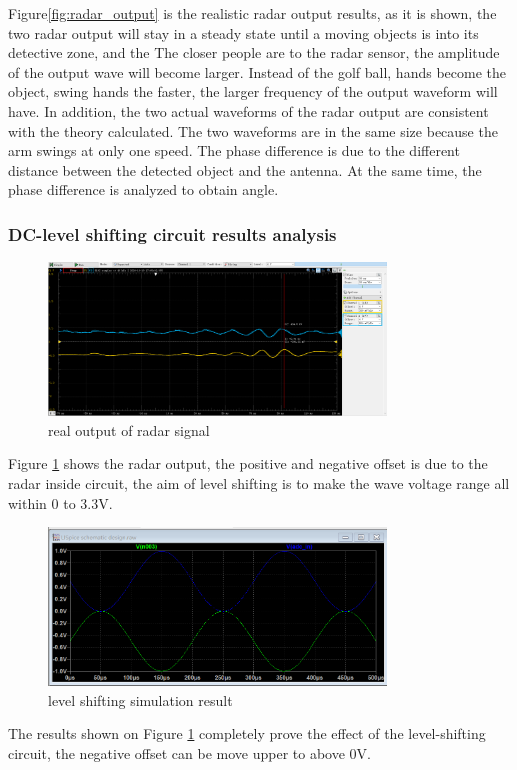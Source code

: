 Figure\ref{fig:radar_output} is the realistic radar output results, as it is shown, the two radar output will stay in a steady state until a moving objects is into its detective zone, and the The closer people are to the radar sensor, the amplitude of the output wave will become larger. Instead of the golf ball, hands become the object, swing hands the faster, the larger frequency of the output waveform will have.
In addition, the two actual waveforms of the radar output are consistent with the theory calculated. The two waveforms are in the same size because the arm swings at only one speed. The phase difference is due to the different distance between the detected object and the antenna. At the same time, the phase difference is analyzed to obtain angle.

\subsubsection{DC-level shifting circuit results analysis}
\begin{figure}[H]
\centering
\includegraphics[width=0.8\textwidth]{figure/real output of radar signal.png}
\caption{real output of radar signal}
\label{fig:radar1}
\end{figure}
Figure \ref{fig:radar1} shows the radar output, the positive and negative offset is due to the radar inside circuit, the aim of level shifting is to make the wave voltage range all within 0 to 3.3V.
\begin{figure}[H]
\centering
\includegraphics[width=0.8\textwidth]{figure/level shifting simulation result.png}
\caption{level shifting simulation result}
\label{fig:SHIFT}
\end{figure}
The results shown on Figure \ref{fig:radar1} completely prove the effect of the level-shifting circuit, the negative offset can be move upper to above 0V.

